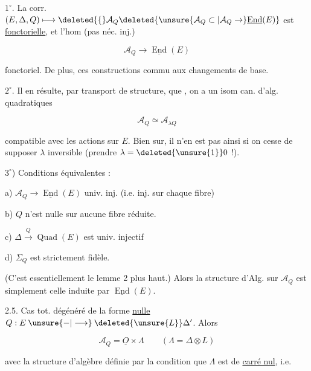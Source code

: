 
 $1^\circ$. La corr. $(E,\Delta,Q)\longmapsto\deleted{\{}\mathcal A_Q\deleted{\unsure{\mathcal A_Q\subset|\mathcal A_Q\to}\underline{\operatorname{End}}(E)}$ est \uline{fonctorielle}, et l'hom (pas néc. inj.)

\[
\mathcal A_Q\longrightarrow\underline{\operatorname{End}}(E)
\]

 fonctoriel. De plus, ces constructions commu aux changements de base.

$2^\circ$. Il en résulte, par transport de structure, que , on a un isom can. d'alg. quadratiques

\[
\mathcal A_Q\simeq\mathcal A_{\lambda Q}
\]

compatible avec les actions sur $E$. Bien sur, il n'en est pas ainsi si on cesse de supposer $\lambda$ inversible (prendre $\lambda=\deleted{\unsure{1}}0$ !).

$3^\circ$) Conditions équivalentes :

a) $\mathcal A_Q\longrightarrow\underline{\operatorname{End}}(E)$ univ. inj. (i.e. inj. sur chaque fibre)

b) $Q$ n'est nulle sur aucune fibre réduite.

c) $\Delta\overset{Q}{\longrightarrow}\operatorname{Quad}(E)$ est univ. injectif

d) $\Sigma_Q$ est strictement fidèle.

(C'est essentiellement le lemme 2 plus haut.) Alors la structure d'Alg. sur $\mathcal A_Q$ est simplement celle induite par $\underline{\operatorname{End}}(E)$.

2.5. Cas tot. dégénéré de la forme \uline{nulle} $Q:E\mathbin{\unsure{-|\longrightarrow}}\deleted{\unsure{L}}\Delta'$. Alors

\[
\mathcal A_Q=\underline O\times\Lambda\qquad(\Lambda=\Delta\otimes L)
\]

avec la structure d'algèbre définie par la condition que $\Lambda$ est de \uline{carré nul}, i.e.
